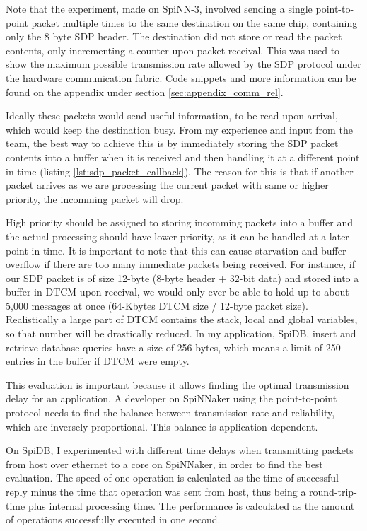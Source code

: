 Note that the experiment, made on SpiNN-3, involved sending a single point-to-point packet multiple times to the same destination on the same chip, containing only the 8 byte SDP header. The destination did not store or read the packet contents, only incrementing a counter upon packet receival. This was used to show the maximum possible transmission rate allowed by the SDP protocol under the hardware communication fabric. Code snippets and more information can be found on the appendix under section \ref{sec:appendix_comm_rel}.

Ideally these packets would send useful information, to be read upon arrival, which would keep the destination busy. From my experience and input from the team, the best way to achieve this is by immediately storing the SDP packet contents into a buffer when it is received and then handling it at a different point in time (listing \ref{lst:sdp_packet_callback}). The reason for this is that if another packet arrives as we are processing the current packet with same or higher priority, the incomming packet will drop.

High priority should be assigned to storing incomming packets into a buffer and the actual processing should have lower priority, as it can be handled at a later point in time. It is important to note that this can cause starvation and buffer overflow if there are too many immediate packets being received. For instance, if our SDP packet is of size 12-byte (8-byte header + 32-bit data) and stored into a buffer in DTCM upon receival, we would only ever be able to hold up to about 5,000 messages at once (64-Kbytes DTCM size / 12-byte packet size). Realistically a large part of DTCM contains the stack, local and global variables, so that number will be drastically reduced. In my application, SpiDB, insert and retrieve database queries have a size of 256-bytes, which means a limit of 250 entries in the buffer if DTCM were empty.

This evaluation is important because it allows finding the optimal transmission delay for an application. A developer on SpiNNaker using the point-to-point protocol needs to find the balance between transmission rate and reliability, which are inversely proportional. This balance is application dependent.



On SpiDB, I experimented with different time delays when transmitting packets from host over ethernet to a core on SpiNNaker, in order to find the best evaluation. The speed of one operation is calculated as the time of successful reply minus the time that operation was sent from host, thus being a round-trip-time plus internal processing time. The performance is calculated as the amount of operations successfully executed in one second.


